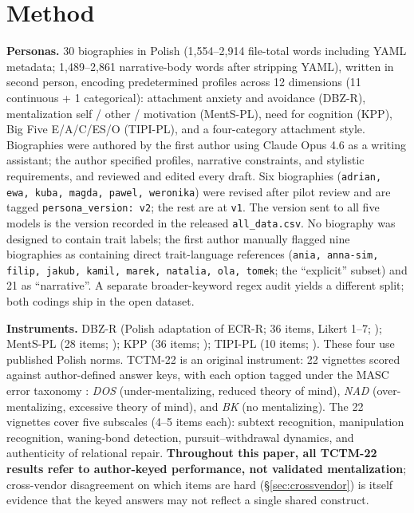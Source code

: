 \documentclass[11pt,a4paper]{article}
\begin{document}
\section{Method}

\textbf{Personas.} 30 biographies in Polish (1{,}554--2{,}914 file-total words including YAML metadata; 1{,}489--2{,}861 narrative-body words after stripping YAML), written in second person, encoding predetermined profiles across 12 dimensions (11 continuous + 1 categorical): attachment anxiety and avoidance (DBZ-R), mentalization self / other / motivation (MentS-PL), need for cognition (KPP), Big Five E/A/C/ES/O (TIPI-PL), and a four-category attachment style. Biographies were authored by the first author using Claude Opus 4.6 as a writing assistant; the author specified profiles, narrative constraints, and stylistic requirements, and reviewed and edited every draft. Six biographies (\texttt{adrian, ewa, kuba, magda, pawel, weronika}) were revised after pilot review and are tagged \texttt{persona\_version: v2}; the rest are at \texttt{v1}. The version sent to all five models is the version recorded in the released \texttt{all\_data.csv}. No biography was designed to contain trait labels; the first author manually flagged nine biographies as containing direct trait-language references (\texttt{ania, anna-sim, filip, jakub, kamil, marek, natalia, ola, tomek}; the ``explicit'' subset) and 21 as ``narrative''. A separate broader-keyword regex audit yields a different split; both codings ship in the open dataset.

\textbf{Instruments.} DBZ-R (Polish adaptation of ECR-R; 36 items, Likert 1--7; \citealt{lubiewska2016}); MentS-PL (28 items; \citealt{janczak2021}); KPP (36 items; \citealt{matusz2011}); TIPI-PL (10 items; \citealt{sorokowska2014}). These four use published Polish norms. TCTM-22 is an original instrument: 22 vignettes scored against author-defined answer keys, with each option tagged under the MASC error taxonomy \cite{dziobek2006}: \emph{DOS} (under-mentalizing, reduced theory of mind), \emph{NAD} (over-mentalizing, excessive theory of mind), and \emph{BK} (no mentalizing). The 22 vignettes cover five subscales (4--5 items each): subtext recognition, manipulation recognition, waning-bond detection, pursuit--withdrawal dynamics, and authenticity of relational repair. \textbf{Throughout this paper, all TCTM-22 results refer to author-keyed performance, not validated mentalization}; cross-vendor disagreement on which items are hard (\S\ref{sec:crossvendor}) is itself evidence that the keyed answers may not reflect a single shared construct.
\end{document}

